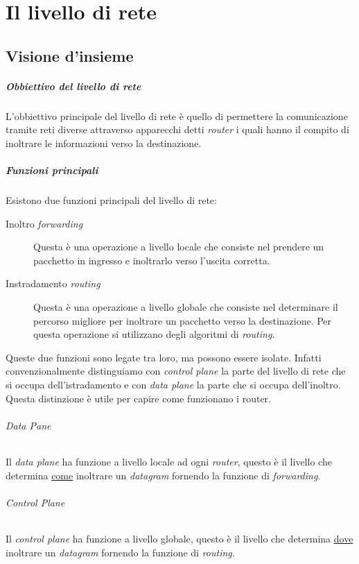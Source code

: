 \chapter{Il livello di rete}
\label{cap:livelloRete}
\thispagestyle{chapterInit}
\section{Visione d'insieme}
    \paragraph{Obbiettivo del livello di rete} L'obbiettivo principale del livello di rete è quello di permettere la comunicazione tramite reti diverse attraverso apparecchi detti \textit{router} i quali hanno il compito di inoltrare le informazioni verso la destinazione.
    \paragraph{Funzioni principali} Esistono due funzioni principali del livello di rete: \begin{description}
        \item[Inoltro \textit{forwarding}] Questa è una operazione a livello locale che consiste nel prendere un pacchetto in ingresso e inoltrarlo verso l'uscita corretta.
        \item[Instradamento \textit{routing}] Questa è una operazione a livello globale che consiste nel determinare il percorso migliore per inoltrare un pacchetto verso la destinazione. Per questa operazione si utilizzano degli algoritmi di \textit{routing}.
    \end{description}
    Queste due funzioni sono legate tra loro, ma possono essere isolate. Infatti convenzionalmente distinguiamo con \textit{control plane} la parte del livello di rete che si occupa dell'istradamento e con \textit{data plane} la parte che si occupa dell'inoltro. Questa distinzione è utile per capire come funzionano i router.
    \subparagraph{\textit{Data Pane}} Il \textit{data plane} ha funzione a livello locale ad ogni \textit{router}, questo è il livello che determina \underline{come} inoltrare un \textit{datagram} fornendo la funzione di \textit{forwarding}.
    \subparagraph{\textit{Control Plane}} Il \textit{control plane} ha funzione a livello globale, questo è il livello che determina \underline{dove} inoltrare un \textit{datagram} fornendo la funzione di \textit{routing}.
